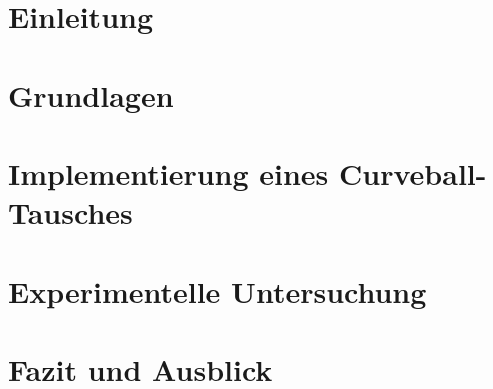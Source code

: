 \documentclass[a4paper,twoside, 11pt, openright]{scrbook}
\theoremstyle{plain} %
\theoremstyle{definition} %
\newcommand{\ct}{Curveball-Tausch}
\begin{document}
\chapter{Einleitung}





\chapter{Grundlagen}





\chapter{Implementierung eines \ct{es} }





\chapter{Experimentelle Untersuchung}





\chapter{Fazit und Ausblick}











\listoffigures{}
\listoftables{}
\end{document}
